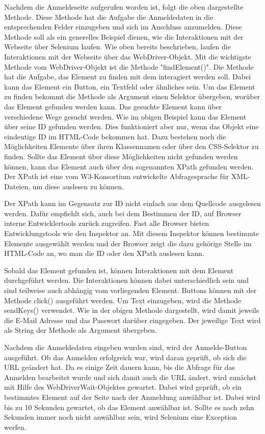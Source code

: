 \documentclass{llncs}
\begin{document}
Nachdem die Anmeldeseite aufgerufen worden ist, folgt die oben dargestellte Methode. Diese Methode hat die Aufgabe die Anmeldedaten in die entsprechenden Felder einzugeben und sich im Anschluss anzumelden. Diese Methode soll als ein generelles Beispiel dienen, wie die Interaktionen mit der Webseite über Selenium laufen. Wie oben bereits beschrieben, laufen die Interaktionen mit der Webseite über das WebDriver-Objekt. Mit die wichtigste Methode vom WebDriver-Objekt ist die Methode "findElement()". Die Methode hat die Aufgabe, das Element zu finden mit dem interagiert werden soll. Dabei kann das Element ein Button, ein Textfeld oder ähnliches sein. Um das Element zu finden bekommt die Methode als Argument einen Selektor übergeben, worüber das Element gefunden werden kann.  Das gesuchte Element kann über verschiedene Wege gesucht werden. Wie im obigen Beispiel kann das Element über seine ID gefunden werden. Dies funktioniert aber nur, wenn das Objekt eine eindeutige ID im HTML-Code bekommen hat. Dazu bestehen noch die Möglichkeiten Elemente über ihren Klassennamen oder über den CSS-Selektor zu finden. Sollte das Element über diese Möglichkeiten nicht gefunden werden können, kann das Element auch über den sogenannten XPath gefunden werden. Der XPath ist eine vom W3-Konsortium entwickelte Abfragesprache für XML-Dateien, um diese auslesen zu können.

Der XPath kann im Gegensatz zur ID nicht einfach aus dem Quellcode ausgelesen werden. Dafür empfiehlt sich, auch bei dem Bestimmen der ID, auf Browser interne Entwicklertools zurück zugreifen. Fast alle Browser bieten Entwicklungstools wie den Inspektor an. Mit diesem Inspektor können bestimmte Elemente ausgewählt werden und der Browser zeigt die dazu gehörige Stelle im HTML-Code an, wo man die ID oder den XPath auslesen kann.

Sobald das Element gefunden ist, können Interaktionen mit dem Element durchgeführt werden. Die Interaktionen können dabei unterschiedlich sein und sind teilweise auch abhängig vom vorliegenden Element. Buttons können mit der Methode click() ausgeführt werden. Um Text einzugeben, wird die Methode sendKeys() verwendet. Wie in der obigen Methode dargestellt, wird damit jeweils die E-Mail Adresse und das Passwort darüber eingegeben. Der jeweilige Text wird als String der Methode als Argument übergeben. 

Nachdem die Anmeldedaten eingeben wurden sind, wird der Anmelde-Button ausgeführt. Ob das Anmelden erfolgreich war, wird daran geprüft, ob sich die URL geändert hat. Da es einige Zeit dauern kann, bis die Abfrage für das Anmelden bearbeitet wurde und sich damit auch die URL ändert, wird zunächst mit Hilfe des WebDriverWait-Objektes gewartet. Dabei wird geprüft, ob ein bestimmtes Element auf der Seite nach der Anmeldung anwählbar ist. Dabei wird bis zu 10 Sekunden gewartet, ob das Element anwählbar ist. Sollte es nach zehn Sekunden immer noch nicht anwählbar sein, wird Selenium eine Exception werfen.
\end{document}
